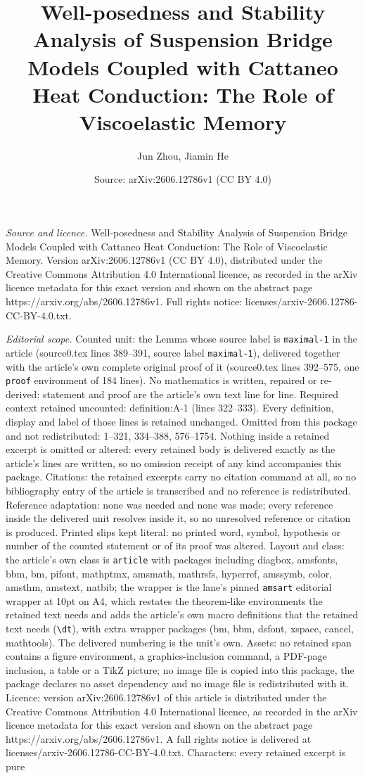 \documentclass[10pt,a4paper]{amsart}
\title[Well-posedness and Stability Analysis of Suspension Bridge M]{Well-posedness and Stability Analysis of Suspension Bridge Models Coupled with Cattaneo Heat Conduction: The Role of Viscoelastic Memory}
\author{Jun Zhou, Jiamin He}
\date{Source: arXiv:2606.12786v1 (CC BY 4.0)}
\begin{document}
\maketitle

\noindent\emph{Source and licence.} Well-posedness and Stability Analysis of Suspension Bridge Models Coupled with Cattaneo Heat Conduction: The Role of Viscoelastic Memory. Version arXiv:2606.12786v1 (CC BY 4.0), distributed under the Creative Commons Attribution 4.0 International licence, as recorded in the arXiv licence metadata for this exact version and shown on the abstract page https://arxiv.org/abs/2606.12786v1. Full rights notice: licenses/arxiv-2606.12786-CC-BY-4.0.txt.\par\smallskip

\noindent\textit{Editorial scope.} Counted unit: the Lemma whose source label is \texttt{maximal-1} in the article (source0.tex lines 389--391, source label \texttt{maximal-1}), delivered together with the article's own complete original proof of it (source0.tex lines 392--575, one \texttt{proof} environment of 184 lines). No mathematics is written, repaired or re-derived: statement and proof are the article's own text line for line. Required context retained uncounted: definition:A-1 (lines 322--333). Every definition, display and label of those lines is retained unchanged. Omitted from this package and not redistributed: 1--321, 334--388, 576--1754. Nothing inside a retained excerpt is omitted or altered: every retained body is delivered exactly as the article's lines are written, so no omission receipt of any kind accompanies this package. Citations: the retained excerpts carry no citation command at all, so no bibliography entry of the article is transcribed and no reference is redistributed. Reference adaptation: none was needed and none was made; every reference inside the delivered unit resolves inside it, so no unresolved reference or citation is produced. Printed slips kept literal: no printed word, symbol, hypothesis or number of the counted statement or of its proof was altered. Layout and class: the article's own class is \texttt{article} with packages including diagbox, amsfonts, bbm, bm, pifont, mathptmx, amsmath, mathrsfs, hyperref, amssymb, color, amsthm, amstext, natbib; the wrapper is the lane's pinned \texttt{amsart} editorial wrapper at 10pt on A4, which restates the theorem-like environments the retained text needs and adds the article's own macro definitions that the retained text needs (\texttt{\textbackslash dt}), with extra wrapper packages (bm, bbm, dsfont, xspace, cancel, mathtools). The delivered numbering is the unit's own. Assets: no retained span contains a figure environment, a graphics-inclusion command, a PDF-page inclusion, a table or a TikZ picture; no image file is copied into this package, the package declares no asset dependency and no image file is redistributed with it. Licence: version arXiv:2606.12786v1 of this article is distributed under the Creative Commons Attribution 4.0 International licence, as recorded in the arXiv licence metadata for this exact version and shown on the abstract page https://arxiv.org/abs/2606.12786v1. A full rights notice is delivered at licenses/arxiv-2606.12786-CC-BY-4.0.txt. Characters: every retained excerpt is pure 
\end{document}
